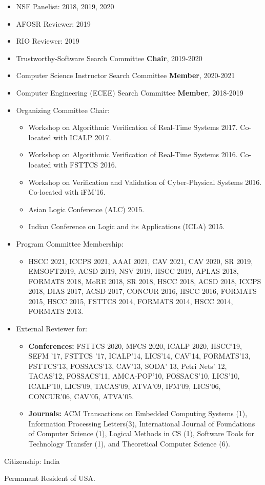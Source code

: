 \documentclass{article}
\begin{document}
\begin{itemize}
\item NSF Panelist: 2018, 2019, 2020
\item AFOSR Reviewer: 2019
\item RIO Reviewer: 2019
\item Trustworthy-Software Search Committee {\bf Chair}, 2019-2020
\item Computer Science Instructor Search Committee {\bf Member}, 2020-2021
\item Computer Engineering (ECEE) Search Committee {\bf Member}, 2018-2019
\item Organizing Committee Chair:
  \begin{itemize}
  \item
   Workshop on Algorithmic Verification of Real-Time Systems 2017. Co-located
   with ICALP 2017.
  \item
   Workshop on Algorithmic Verification of Real-Time Systems 2016. Co-located
   with FSTTCS 2016.
 \item
   Workshop on Verification and Validation of
      Cyber-Physical Systems 2016. Co-located with iFM'16.
    \item Asian Logic Conference (ALC) 2015.
    \item Indian Conference on Logic and its Applications (ICLA) 2015.
  \end{itemize}
\item Program Committee Membership:
  \begin{itemize}
  \item 
  HSCC 2021, ICCPS 2021, AAAI 2021, CAV 2021, CAV 2020, SR 2019, EMSOFT2019, ACSD 2019, NSV 2019, HSCC 2019, APLAS
  2018, FORMATS 2018, MoRE 2018, SR 2018, HSCC 2018, ACSD 2018, ICCPS 2018, DIAS
  2017, ACSD 2017, CONCUR 2016, HSCC 2016, FORMATS 2015, HSCC 2015, FSTTCS 2014,
  FORMATS 2014, HSCC 2014, FORMATS 2013.
  \end{itemize}
\item External Reviewer for:
  \begin{itemize}
  \item {\bf Conferences:}
    FSTTCS 2020, MFCS 2020, ICALP 2020, HSCC'19, SEFM '17, FSTTCS '17, ICALP'14, LICS'14, CAV'14, FORMATS'13, FSTTCS'13, FOSSACS'13, CAV'13, SODA'
    13, Petri Nets' 12, TACAS'12, FOSSACS'11, AMCA-POP'10, FOSSACS'10, LICS'10,
    ICALP'10, LICS'09, TACAS'09, ATVA'09, IFM'09, LICS'06, CONCUR'06,
    CAV'05, ATVA'05.
  \item {\bf Journals:}
    ACM Transactions on Embedded Computing Systems (1),
    Information Processing Letters(3),
    International Journal of Foundations  of Computer Science (1), Logical Methods
    in CS (1), Software Tools for Technology Transfer (1), and Theoretical Computer Science (6).  
  \end{itemize}
\end{itemize}

\vspace{1em}

Citizenship: India

Permanant Resident of USA.
\end{document}
